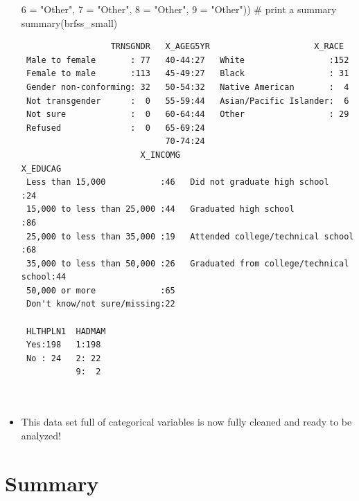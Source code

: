 \documentclass[
  letterpaper,
  DIV=11,
  numbers=noendperiod]{scrreprt}
\newenvironment{Shaded}{\begin{snugshade}}{\end{snugshade}}
\newcommand{\AttributeTok}[1]{\textcolor[rgb]{0.40,0.45,0.13}{#1}}
\newcommand{\CommentTok}[1]{\textcolor[rgb]{0.37,0.37,0.37}{#1}}
\newcommand{\FunctionTok}[1]{\textcolor[rgb]{0.28,0.35,0.67}{#1}}
\newcommand{\NormalTok}[1]{\textcolor[rgb]{0.00,0.23,0.31}{#1}}
\newcommand{\OtherTok}[1]{\textcolor[rgb]{0.00,0.23,0.31}{#1}}
\newcommand{\StringTok}[1]{\textcolor[rgb]{0.13,0.47,0.30}{#1}}
\begin{document}
\begin{itemize}
\begin{Shaded}
\begin{Highlighting}[]
        \StringTok{\textasciigrave{}}\AttributeTok{6}\StringTok{\textasciigrave{}} \OtherTok{=} \StringTok{"Other"}\NormalTok{, }\StringTok{\textasciigrave{}}\AttributeTok{7}\StringTok{\textasciigrave{}} \OtherTok{=} \StringTok{"Other"}\NormalTok{, }\StringTok{\textasciigrave{}}\AttributeTok{8}\StringTok{\textasciigrave{}} \OtherTok{=} \StringTok{"Other"}\NormalTok{, }\StringTok{\textasciigrave{}}\AttributeTok{9}\StringTok{\textasciigrave{}} \OtherTok{=} \StringTok{"Other"}\NormalTok{))}
\CommentTok{\# print a summary}
\FunctionTok{summary}\NormalTok{(brfss\_small)}
\end{Highlighting}
\end{Shaded}

\begin{verbatim}
                  TRNSGNDR   X_AGEG5YR                     X_RACE   
 Male to female       : 77   40-44:27   White                 :152  
 Female to male       :113   45-49:27   Black                 : 31  
 Gender non-conforming: 32   50-54:32   Native American       :  4  
 Not transgender      :  0   55-59:44   Asian/Pacific Islander:  6  
 Not sure             :  0   60-64:44   Other                 : 29  
 Refused              :  0   65-69:24                               
                             70-74:24                               
                        X_INCOMG                                     X_EDUCAG 
 Less than 15,000           :46   Did not graduate high school           :24  
 15,000 to less than 25,000 :44   Graduated high school                  :86  
 25,000 to less than 35,000 :19   Attended college/technical school      :68  
 35,000 to less than 50,000 :26   Graduated from college/technical school:44  
 50,000 or more             :65                                               
 Don't know/not sure/missing:22                                               

 HLTHPLN1  HADMAM 
 Yes:198   1:198  
 No : 24   2: 22  
           9:  2  



\end{verbatim}
\item
  This data set full of categorical variables is now fully cleaned and
  ready to be analyzed!
\end{itemize}


\chapter{Summary}\label{summary-3}
\end{document}
